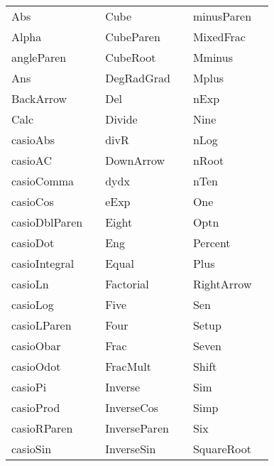 \documentclass[12pt]{article}
\newenvironment{fonttable}{\begin{center}}{\end{center}}
\begin{document}
\clearpage
\begin{fonttable}
\begin{tabular}{LCLCLC}
Abs 	&	 \Abs 	&	Cube 	&	 \Cube 	&	minusParen 	&	 \minusParen 	\\
Alpha 	&	 \Alpha 	&	CubeParen 	&	 \CubeParen 	&	MixedFrac 	&	 \MixedFrac 	\\
angleParen 	&	 \angleParen	&	CubeRoot 	&	 \CubeRoot 	&	Mminus 	&	 \Mminus 	\\
Ans 	&	 \Ans 	&	DegRadGrad 	&	 \DegRadGrad 	&	Mplus 	&	 \Mplus 	\\
BackArrow 	&	 \BackArrow 	&	Del 	&	 \Del 	&	nExp 	&	 \nExp 	\\
Calc 	&	 \Calc 	&	Divide 	&	 \Divide 	&	Nine 	&	 \Nine 	\\
casioAbs 	&	 \casioAbs 	&	divR 	&	 \divR 	&	nLog 	&	 \nLog 	\\
casioAC 	&	 \casioAC 	&	DownArrow 	&	 \DownArrow 	&	nRoot 	&	 \nRoot 	\\
casioComma 	&	 \casioComma 	&	dydx 	&	 \dydx 	&	nTen 	&	 \nTen 	\\
casioCos 	&	 \casioCos 	&	eExp 	&	 \eExp 	&	One 	&	 \One 	\\
casioDblParen 	&	 \casioDblParen 	&	Eight 	&	 \Eight 	&	Optn 	&	 \Optn 	\\
casioDot 	&	 \casioDot 	&	Eng 	&	 \Eng 	&	Percent 	&	 \Percent 	\\
casioIntegral 	&	 \casioIntegral 	&	Equal 	&	 \Equal 	&	Plus 	&	 \Plus 	\\
casioLn 	&	 \casioLn 	&	Factorial 	&	 \Factorial 	&	RightArrow 	&	 \RightArrow 	\\
casioLog 	&	 \casioLog 	&	Five 	&	 \Five 	&	Sen 	&	 \Sen 	\\
casioLParen 	&	 \casioLParen 	&	Four 	&	 \Four 	&	Setup 	&	 \Setup 	\\
casioObar 	&	 \casioObar 	&	Frac 	&	 \Frac 	&	Seven 	&	 \Seven 	\\
casioOdot 	&	 \casioOdot 	&	FracMult 	&	 \FracMult 	&	Shift 	&	 \Shift 	\\
casioPi 	&	 \casioPi 	&	Inverse 	&	 \Inverse 	&	Sim 	&	 \Sim 	\\
casioProd 	&	 \casioProd 	&	InverseCos 	&	 \InverseCos 	&	Simp 	&	 \Simp 	\\
casioRParen 	&	 \casioRParen 	&	InverseParen 	&	 \InverseParen 	&	Six 	&	 \Six 	\\
casioSin 	&	 \casioSin 	&	InverseSin 	&	 \InverseSin 	&	SquareRoot 	&	 \SquareRoot 	\\

\end{tabular}
\end{fonttable}
\end{document}
